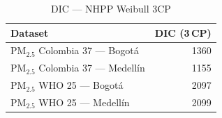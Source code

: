 \begin{table}[htbp]
\centering
\caption{DIC --- NHPP Weibull 3CP}
\label{tab:nhpp_dic_3cp}
\begin{tabular}{lr}
\toprule
Dataset & DIC (3\,CP) \\
\midrule
PM$_{2.5}$ Colombia 37 --- Bogot\'{a} & 1360 \\
PM$_{2.5}$ Colombia 37 --- Medell\'{i}n & 1155 \\
PM$_{2.5}$ WHO 25 --- Bogot\'{a} & 2097 \\
PM$_{2.5}$ WHO 25 --- Medell\'{i}n & 2099 \\
\bottomrule
\end{tabular}
\end{table}
